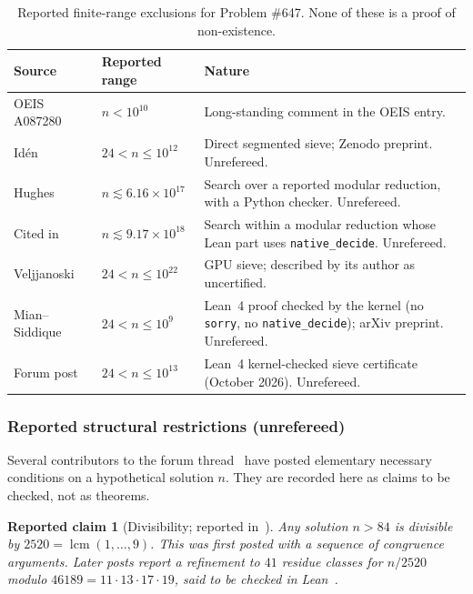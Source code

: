 \documentclass[11pt]{amsart}
\theoremstyle{plain}
\newtheorem{claim}[theorem]{Reported claim}
\theoremstyle{definition}
\theoremstyle{remark}
\numberwithin{equation}{section}
\DeclareMathOperator{\lcm}{lcm}
\begin{document}
\begin{table}[ht]
\centering
\small
\begin{tabular}{@{}p{4.2cm}p{2.6cm}p{6.2cm}@{}}
\toprule
\textbf{Source} & \textbf{Reported range} & \textbf{Nature} \\
\midrule
OEIS A087280~\cite{OEIS_A087280} & $n<10^{10}$ & Long-standing comment in the OEIS entry. \\
Id\'en~\cite{Iden2026,Forum647} & $24<n\le10^{12}$ & Direct segmented sieve; Zenodo preprint. Unrefereed. \\
Hughes~\cite{Hughes2026,Forum647} & $n\lesssim6.16\times10^{17}$ & Search over a reported modular reduction, with a Python checker. Unrefereed. \\
Cited in~\cite{MianSiddique2026,Forum647} & $n\lesssim9.17\times10^{18}$ & Search within a modular reduction whose Lean part uses \texttt{native\_decide}. Unrefereed. \\
Veljjanoski~\cite{Veljjanoski2026,OEIS_A087280} & $24<n\le10^{22}$ & GPU sieve; described by its author as uncertified. \\
Mian--Siddique~\cite{MianSiddique2026} & $24<n\le10^{9}$ & Lean~4 proof checked by the kernel (no \texttt{sorry}, no \texttt{native\_decide}); arXiv preprint. Unrefereed. \\
Forum post~\cite{Forum647} & $24<n\le10^{13}$ & Lean~4 kernel-checked sieve certificate (October 2026). Unrefereed. \\
\bottomrule
\end{tabular}
\caption{Reported finite-range exclusions for Problem \#647. None of these is a proof of non-existence.}
\label{tab:computations}
\end{table}

\subsubsection*{Reported structural restrictions (unrefereed)}
Several contributors to the forum thread~\cite{Forum647} have posted elementary necessary conditions on a hypothetical solution $n$. They are recorded here as claims to be checked, not as theorems.

\begin{claim}[Divisibility; reported in~\cite{Forum647}]\label{claim:2520}
Any solution $n>84$ is divisible by $2520=\lcm(1,\dots,9)$. This was first posted with a sequence of congruence arguments. Later posts report a refinement to $41$ residue classes for $n/2520$ modulo $46189=11\cdot13\cdot17\cdot19$, said to be checked in Lean~\cite{Hughes2026}.
\end{claim}
\end{document}
